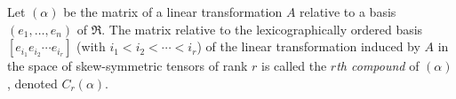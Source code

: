 Let $(\alpha)$ be the matrix of a linear transformation $A$ relative to a basis $(e_1, \ldots, e_n)$ of $\Re$. The matrix relative to the lexicographically ordered basis $[e_{i_1} e_{i_2} \cdots e_{i_r}]$ (with $i_1 < i_2 < \cdots < i_r$) of the linear transformation induced by $A$ in the space of skew-symmetric tensors of rank $r$ is called the \textit{$r$th compound} of $(\alpha)$, denoted $C_r(\alpha)$.
